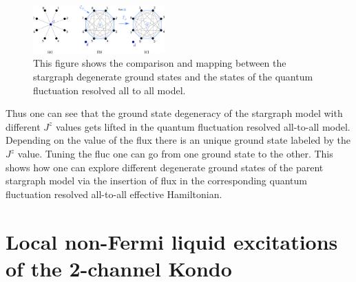 \documentclass[reprint,prb,superscriptaddress]{revtex4-2}
\begin{document}
\begin{figure}[!htpb]
\centering
\includegraphics[width=0.45\textwidth]{plt/stargraph-to-alltoall}
\caption{This figure shows the comparison and mapping between the stargraph degenerate ground states and the states of the quantum fluctuation resolved all to all model.}
\label{fig:stargraph-to-alltoall}
\end{figure}
Thus one can see that the ground state degeneracy of the stargraph model with different $J^z$ values gets lifted in the quantum fluctuation resolved all-to-all model. Depending on the value of the flux there is an unique ground state labeled by the $J^z$ value. Tuning the fluc one can go from one ground state to the other. This shows how one can explore different degenerate ground states of the parent stargraph model via the insertion of flux in the corresponding quantum fluctuation resolved all-to-all effective Hamiltonian.


\section{Local non-Fermi liquid excitations of the 2-channel Kondo}
\end{document}
